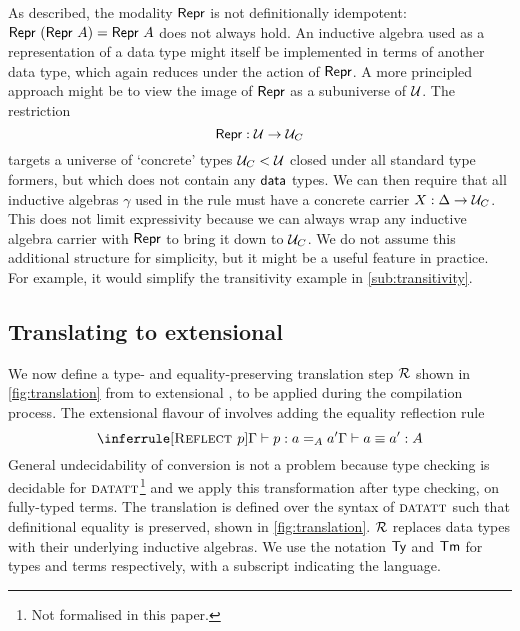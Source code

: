 As described, the modality $\textsf{Repr}$ is not definitionally idempotent: $\textsf{Repr}\
(\textsf{Repr}\ A) = \textsf{Repr}\ A$ does not always hold. An inductive algebra used as a
representation of a data type might itself be implemented in terms of another
data type, which again reduces under the action of $\textsf{Repr}$. A more principled
approach might be to view the image of $\textsf{Repr}$ as a subuniverse of $\mathcal{U}$. The
restriction
$$
\textsf{Repr} : \mathcal{U} \to \mathcal{U}_C
$$
targets a universe of `concrete' types $\mathcal{U}_C < \mathcal{U}$ closed under all
standard type formers, but which does not contain any $\textsf{data}$ types. We can
then require that all inductive algebras $\gamma$ used in the rule
\hyperlink{Data-Form}{\axiom{Data-Form}} must have a concrete carrier $X : \Delta \to \mathcal{U}_C$. This
does not limit expressivity because we can always wrap any inductive algebra
carrier with $\textsf{Repr}$ to bring it down to $\mathcal{U}_C$. We do not assume this
additional structure for simplicity, but it might be a useful feature in
practice. For example, it would simplify the transitivity example in
\cref{sub:transitivity}.

\subsection{Translating to extensional \langmltt} \label{sub:translation}

We now define a type- and equality-preserving translation step $\mathcal{R}$ shown in
\cref{fig:translation} from \lambdadata to extensional \langmltt, to be
applied during the compilation process. The extensional flavour of \lambdamltt
involves adding the equality reflection rule
\[
\inferrule[\axiom{Reflect $p$}]{\Gamma \vdash p : a =_A a'}{\Gamma \vdash a \equiv a' : A}
\]
General undecidability of conversion is not a problem because type checking is
decidable for ${\textsc{datatt}}$\footnote{Not formalised in this paper.} and we
apply this transformation after type checking, on fully-typed terms. The
translation is defined over the syntax of ${\textsc{datatt}}$ \cite{Boulier2017-cm}
such that definitional equality is preserved, shown in
\cref{fig:translation}. $\mathcal{R}$ replaces data types with their underlying inductive
algebras. We use the notation $\textsf{Ty}$ and $\textsf{Tm}$ for types and terms respectively,
with a subscript indicating the language.

